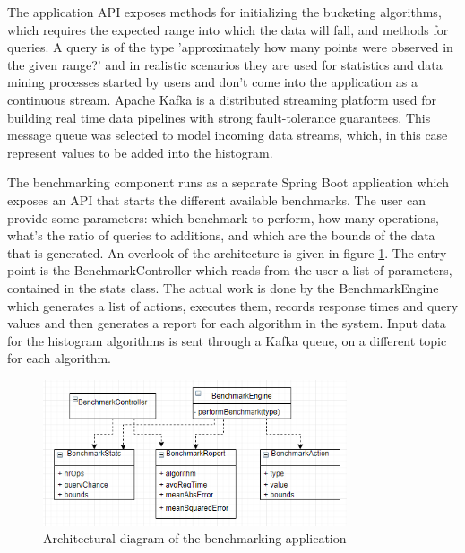 \documentclass[12pt]{article}
\begin{document}
	The application API exposes methods for initializing the bucketing algorithms, 
	which requires the expected range into which the data will fall, and methods 
	for queries. A query is of the type 'approximately how many points were observed
	in the given range?' and in realistic scenarios they are used for statistics 
	and data mining processes started by users and don't come into the application 
	as a continuous stream. Apache Kafka\cite{Kafka} is a distributed streaming platform
	used for building real time data pipelines with strong fault-tolerance guarantees.
	This message queue was selected to model incoming data streams, which, in this 
	case represent values to be added into the histogram.

	The benchmarking component runs as a separate Spring Boot application which 
	exposes an API that starts the different available benchmarks. The user 
	can provide some parameters: which benchmark to perform, how many operations, 
	what's the ratio of queries to additions, and which are the bounds of the data that is 
	generated. An overlook of the architecture is given in figure \ref{architecture}.
	The entry point is the BenchmarkController which reads from the user a list of 
	parameters, contained in the stats class. The actual work is done by the BenchmarkEngine
	which generates a list of actions, executes them, records response times and query values 
	and then generates a report for each algorithm in the system. Input data for the 
	histogram algorithms is sent through a Kafka queue, on a different topic for each 
	algorithm.

	\begin{figure}
		\label{architecture}
		\caption{Architectural diagram of the benchmarking application}
		\centering
		  \includegraphics[width=0.8\textwidth]{diagram.png}
	\end{figure}
\end{document}
